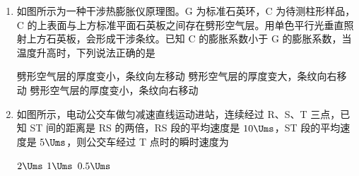 \documentclass[\gkver]{gaokaozhenti}
\begin{document}
\begin{enumerate}
{则筒车对灌入稻田的水做功的功率为 $P = \frac{W}{T}$，$T = \frac{2\pi}{\omega}$

联立有 $P = \frac{3}{5}nmg\omega RH$

故选 B。
}

\item
如图所示为一种干涉热膨胀仪原理图。G 为标准石英环，C 为待测柱形样品，C 的上表面与上方标准平面石英板之间存在劈形空气层。用单色平行光垂直照射上方石英板，会形成干涉条纹。已知 C 的膨胀系数小于 G 的膨胀系数，当温度升高时，下列说法正确的是


{劈形空气层的厚度变小，条纹向左移动}
{劈形空气层的厚度变大，条纹向右移动}
{劈形空气层的厚度变小，条纹向右移动}


\item
如图所示，电动公交车做匀减速直线运动进站，连续经过 R、S、T 三点，已知 ST 间的距离是 RS 的两倍，RS 段的平均速度是 $10 \Ums$，ST 段的平均速度是 $5 \Ums$，则公交车经过 T 点时的瞬时速度为


\fourchoices[answer=C]
{$3 \Ums$}
{$2 \Ums$}
{$1 \Ums$}
{$0.5 \Ums$}

\end{enumerate}
\end{document}
